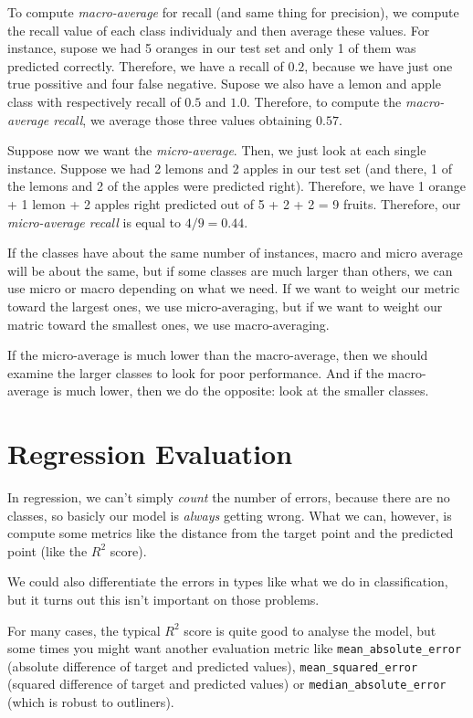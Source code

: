\documentclass[12pt, a4paper, oneside]{article}
\begin{document}
To compute \textit{macro-average} for recall (and same thing for precision), we
compute the recall value of each class individualy and then average these
values. For instance, supose we had 5 oranges in our test set and only 1 of them
was predicted correctly. Therefore, we have a recall of $0.2$, because we have
just one true possitive and four false negative. Supose we also have a lemon and
apple class with respectively recall of $0.5$ and $1.0$. Therefore, to compute
the \textit{macro-average recall}, we average those three values obtaining
$0.57$.

Suppose now we want the \textit{micro-average}. Then, we just look at each
single instance. Suppose we had 2 lemons and 2 apples in our test set (and
there, 1 of the lemons and 2 of the apples were predicted right). Therefore, we
have 1 orange + 1 lemon + 2 apples right predicted out of 5 + 2 + 2 = 9 fruits.
Therefore, our \textit{micro-average recall} is equal to $4/9 = 0.44$.

If the classes have about the same number of instances, macro and micro average
will be about the same, but if some classes are much larger than others, we can
use micro or macro depending on what we need. If we want to weight our metric
toward the largest ones, we use micro-averaging, but if we want to weight our
matric toward the smallest ones, we use macro-averaging.

If the micro-average is much lower than the macro-average, then we should
examine the larger classes to look for poor performance. And if the
macro-average is much lower, then we do the opposite: look at the smaller
classes.

\section{Regression Evaluation}

In regression, we can't simply \textit{count} the number of errors, because
there are no classes, so basicly our model is \textit{always} getting wrong.
What we can, however, is compute some metrics like the distance from the target
point and the predicted point (like the $R^2$ score).

We could also differentiate the errors in types like what we do in
classification, but it turns out this isn't important on those problems.

For many cases, the typical $R^2$ score is quite good to analyse the model, but
some times you might want another evaluation metric like
\texttt{mean\_absolute\_error} (absolute difference of target and predicted
values), \texttt{mean\_squared\_error} (squared difference of target and
predicted values) or \texttt{median\_absolute\_error} (which is robust to
outliners).

\end{document}
